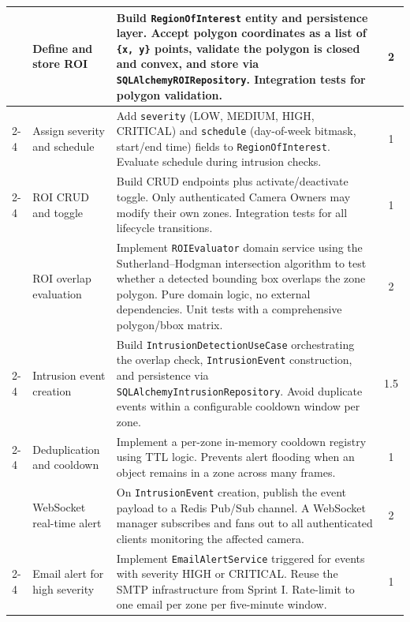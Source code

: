 \begin{sloppypar}
\begin{longtable}{|>{\small}p{2cm}|>{\small}p{4cm}|>{\small}p{5.5cm}|>{\small}c|}
\multirow{3}{*}{\parbox{2cm}{\small ROI Management}} &
Define and store ROI & Build \texttt{RegionOfInterest} entity and persistence layer. Accept polygon coordinates as a list of \texttt{\{x, y\}} points, validate the polygon is closed and convex, and store via \texttt{SQLAlchemyROIRepository}. Integration tests for polygon validation. & 2 \\ \cline{2-4}
& Assign severity and schedule & Add \texttt{severity} (LOW, MEDIUM, HIGH, CRITICAL) and \texttt{schedule} (day-of-week bitmask, start/end time) fields to \texttt{RegionOfInterest}. Evaluate schedule during intrusion checks. & 1 \\ \cline{2-4}
& ROI CRUD and toggle & Build CRUD endpoints plus activate/deactivate toggle. Only authenticated Camera Owners may modify their own zones. Integration tests for all lifecycle transitions. & 1 \\ \hline

\multirow{3}{*}{\parbox{2cm}{\small Intrusion Detection Core}} &
ROI overlap evaluation & Implement \texttt{ROIEvaluator} domain service using the Sutherland--Hodgman intersection algorithm to test whether a detected bounding box overlaps the zone polygon. Pure domain logic, no external dependencies. Unit tests with a comprehensive polygon/bbox matrix. & 2 \\ \cline{2-4}
& Intrusion event creation & Build \texttt{IntrusionDetectionUseCase} orchestrating the overlap check, \texttt{IntrusionEvent} construction, and persistence via \texttt{SQLAlchemyIntrusionRepository}. Avoid duplicate events within a configurable cooldown window per zone. & 1.5 \\ \cline{2-4}
& Deduplication and cooldown & Implement a per-zone in-memory cooldown registry using TTL logic. Prevents alert flooding when an object remains in a zone across many frames. & 1 \\ \hline

\multirow{2}{*}{\parbox{2cm}{\small Alert System}} &
WebSocket real-time alert & On \texttt{IntrusionEvent} creation, publish the event payload to a Redis Pub/Sub channel. A WebSocket manager subscribes and fans out to all authenticated clients monitoring the affected camera. & 2 \\ \cline{2-4}
& Email alert for high severity & Implement \texttt{EmailAlertService} triggered for events with severity HIGH or CRITICAL. Reuse the SMTP infrastructure from Sprint I. Rate-limit to one email per zone per five-minute window. & 1 \\ \hline


\end{longtable}
\end{sloppypar}
